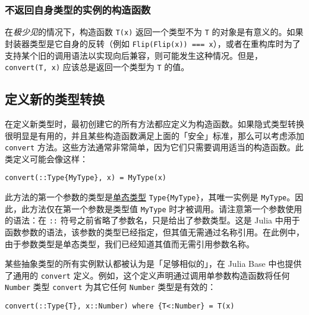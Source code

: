 \hypertarget{1440871335026577968}{}


\subsubsection{不返回自身类型的实例的构造函数}



在\emph{极少见}的情况下，构造函数 \texttt{T(x)} 返回一个类型不为 \texttt{T} 的对象是有意义的。如果封装器类型是它自身的反转（例如 \texttt{Flip(Flip(x)) === x}），或者在重构库时为了支持某个旧的调用语法以实现向后兼容，则可能发生这种情况。但是，\texttt{convert(T, x)} 应该总是返回一个类型为 \texttt{T} 的值。



\hypertarget{16585115796165922811}{}


\subsection{定义新的类型转换}



在定义新类型时，最初创建它的所有方法都应定义为构造函数。如果隐式类型转换很明显是有用的，并且某些构造函数满足上面的「安全」标准，那么可以考虑添加 \texttt{convert} 方法。这些方法通常非常简单，因为它们只需要调用适当的构造函数。此类定义可能会像这样：




\begin{verbatim}
convert(::Type{MyType}, x) = MyType(x)
\end{verbatim}



此方法的第一个参数的类型是\hyperlink{14008188290941962431}{单态类型} \texttt{Type\{MyType\}}，其唯一实例是 \texttt{MyType}。因此，此方法仅在第一个参数是类型值 \texttt{MyType} 时才被调用。请注意第一个参数使用的语法：在 \texttt{::} 符号之前省略了参数名，只是给出了参数类型。这是 Julia 中用于函数参数的语法，该参数的类型已经指定，但其值无需通过名称引用。在此例中，由于参数类型是单态类型，我们已经知道其值而无需引用参数名称。



某些抽象类型的所有实例默认都被认为是「足够相似的」，在 Julia Base 中也提供了通用的 \texttt{convert} 定义。例如，这个定义声明通过调用单参数构造函数将任何 \texttt{Number} 类型 \texttt{convert} 为其它任何 \texttt{Number} 类型是有效的：




\begin{verbatim}
convert(::Type{T}, x::Number) where {T<:Number} = T(x)
\end{verbatim}



